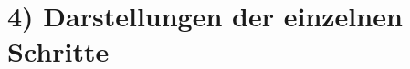 \documentclass[11pt]{article}
\begin{document}
    \begin{center}
    \end{center}
    { \hspace*{\fill} \\}
    
    \hypertarget{darstellungen-der-einzelnen-schritte}{%
\section*{4) Darstellungen der einzelnen
Schritte}\label{darstellungen-der-einzelnen-schritte}}

    \begin{center}
    \end{center}
    { \hspace*{\fill} \\}
    

    
    
    
    
\end{document}
